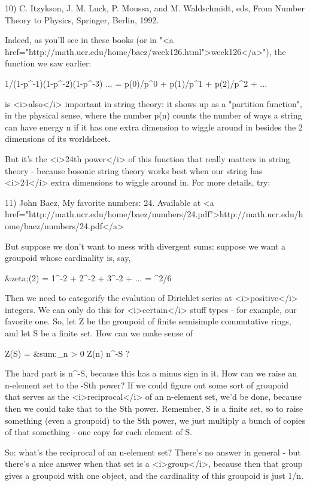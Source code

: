 10) C. Itzykson, J. M. Luck, P. Moussa, and M. Waldschmidt, eds, From Number Theory to Physics, Springer, Berlin, 1992.

Indeed, as you'll see in these books (or in "<a href="http://math.ucr.edu/home/baez/week126.html">week126</a>"), the function we saw earlier:

1/(1-p^{-1})(1-p^{-2})(1-p^{-3}) ... =
p(0)/p^{0} + p(1)/p^{1} + p(2)/p^{2} + ...

is <i>also</i> important in string theory: it shows up as a "partition
function", in the physical sense, where the number p(n) counts the
number of ways a string can have energy n if it has one extra
dimension to wiggle around in besides the 2 dimensions of its
worldsheet.

But it's the <i>24th power</i> of this function that really matters in
string theory - because bosonic string theory works best when our
string has <i>24</i> extra dimensions to wiggle around in.  For more
details, try:

11) John Baez, My favorite numbers: 24.  Available at <a
href="http://math.ucr.edu/home/baez/numbers/24.pdf">http://math.ucr.edu/home/baez/numbers/24.pdf</a>

But suppose we don't want to mess with divergent sums: suppose we want
a groupoid whose cardinality is, say,

&zeta;(2) = 1^{-2} + 2^{-2} + 3^{-2} + ... =
\pi ^{2}/6

Then we need to categorify the evalution of Dirichlet series at
<i>positive</i> integers.  We can only do this for <i>certain</i>
stuff types - for example, our favorite one.  So, let Z be the
groupoid of finite semisimple commutative rings, and let S be a finite
set.  How can we make sense of

Z(S) = &sum;_{n > 0} Z(n) \times  n^{-S} ?

The hard part is n^{-S}, because this has a minus sign in it.
How can we raise an n-element set to the -Sth power?  If we could
figure out some sort of groupoid that serves as the <i>reciprocal</i>
of an n-element set, we'd be done, because then we could take that to
the Sth power.  Remember, S is a finite set, so to raise something
(even a groupoid) to the Sth power, we just multiply a bunch of copies
of that something - one copy for each element of S.

So: what's the reciprocal of an n-element set?  There's no answer in
general - but there's a nice answer when that set is a <i>group</i>,
because then that group gives a groupoid with one object, and the
cardinality of this groupoid is just 1/n.

